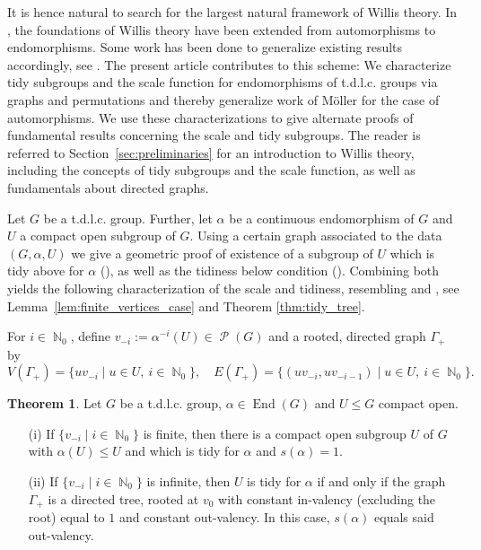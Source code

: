 \documentclass{article}
\DeclareMathOperator\End{End}
\DeclareMathOperator\bbN{\mathbb{N}}
\DeclareMathOperator\calP{\mathcal{P}}
\theoremstyle{definition}
\newtheorem*{theorem*}{Theorem}
\begin{document}
It is hence natural to search for the largest natural framework of Willis theory. In \cite{Wil15}, the foundations of Willis theory have been extended from automorphisms to endomorphisms. Some work has been done to generalize existing results accordingly, see \cite{BGT16}. The present article contributes to this scheme: We characterize tidy subgroups and the scale function for endomorphisms of t.d.l.c. groups via graphs and permutations and thereby generalize work of M{\"o}ller \cite{Moe02} for the case of automorphisms.
We use these characterizations to give alternate proofs of fundamental results concerning the scale and tidy subgroups. The reader is referred to Section~\ref{sec:preliminaries} for an introduction to Willis theory, including the concepts of tidy subgroups and the scale function, as well as fundamentals about directed graphs.

\vspace{0.2cm}
Let $G$ be a t.d.l.c. group. Further, let $\alpha$ be a continuous endomorphism of $G$ and $U$ a compact open subgroup of $G$. Using a certain graph associated to the data $(G,\alpha,U)$ we give a geometric proof of existence of a subgroup of $U$ which is tidy above for $\alpha$ (\cite[Proposition 3]{Wil15}), as well as the tidiness below condition (\cite[Proposition 8]{Wil15}). Combining both yields the following characterization of the scale and tidiness, resembling \cite[Lemma 3.1]{Moe02} and \cite[Theorem 3.4]{Moe02}, see Lemma~\ref{lem:finite_vertices_case} and Theorem \ref{thm:tidy_tree}.

For $i\!\in\!\bbN_{0}$, define $v_{-i}\!:=\!\alpha^{-i}(U)\!\in\!\calP(G)$ and a rooted, directed graph $\Gamma_{+}$ by
\begin{displaymath}
  V(\Gamma_{+})\!=\!\{uv_{-i}\mid u\in U,\ i\in\bbN_{0}\},\quad E(\Gamma_{+})\!=\!\{(uv_{-i},uv_{-i-1})\mid u\in U,\ i\in\bbN_{0}\}.
\end{displaymath}

\begin{theorem*}
Let $G$ be a t.d.l.c. group, $\alpha\in\End(G)$ and $U\le G$ compact open.
\begin{itemize}[leftmargin=1cm]
 \item[(i)] If $\{v_{-i}\mid i\in\bbN_{0}\}$ is finite, then there is a compact open subgroup $U$ of $G$ with $\alpha(U)\le U$ and which is tidy for $\alpha$ and $s(\alpha)=1$.
 \item[(ii)] If $\{v_{-i}\mid i\in\bbN_{0}\}$ is infinite, then $U$ is tidy for $\alpha$ if and only if the graph $\Gamma_{+}$ is a directed tree, rooted at $v_{0}$ with constant in-valency (excluding the root) equal to $1$ and constant out-valency. In this case, $s(\alpha)$ equals said out-valency.
\end{itemize}
\end{theorem*}
\end{document}
